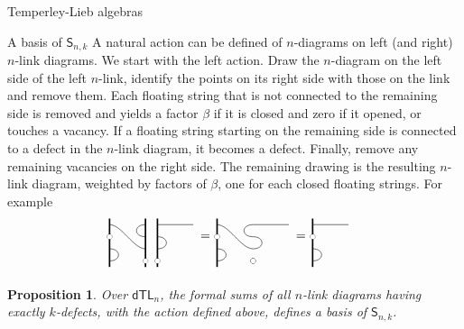 \documentclass[reqno]{amsart}
\newtheorem{Prop}[Thm]{Proposition}
\newcommand{\vac}[1]{\draw (#1) circle (1/5);
 	\fill[white] (#1) circle (1/5)}
\newcommand{\defect}[1]{\draw (#1) --++ (3,0)}
\newcommand{\bord}[2]{\draw[very thick] (#1,-1/2) --++ (0,#2)}
\newcommand{\link}[4]{\draw (#1) .. controls (#2) and (#3) .. (#4)}
\newcommand{\dtl}[1]{\mathsf{dTL}_{#1}}
\newcommand{\ds}[1]{\mathsf S_{#1}}
\begin{document}
\begin{section}{Temperley-Lieb algebras}
\begin{subsection}{A basis of $\ds{n,k}$}
A natural action can be defined of $n$-diagrams on left (and right) $n$-link diagrams. We start with the left action. Draw the $n$-diagram on the left side of the left $n$-link, identify the points on its right side with those on the link and remove them. Each floating string that is not connected to the remaining side is removed and yields a factor $\beta$ if it is closed and zero if it opened, or touches a vacancy. If a floating string starting on the remaining side is connected to a defect in the $n$-link diagram, it becomes a defect. Finally, remove any remaining vacancies on the right side. The remaining drawing is the resulting $n$-link diagram, weighted by factors of $\beta$, one for each closed floating strings. For example
\begin{align*}
\begin{tikzpicture}[scale = 1/3]
	\bord{0}{4};
	\bord{3}{4};
	\link{0,3}{1,3}{2,1}{3,1};
	\link{0,0}{1,0}{1,1}{0,1};
	\link{3,2}{2,2}{2,3}{3,3};
	\vac{0,2};
	\vac{3,0};
	\bord{4}{4};
	\defect{4,3};
	\link{4,2}{5,2}{5,1}{4,1};
	\vac{4,0};
	\node at (8,2) {$=$ };
\end{tikzpicture}&
\begin{tikzpicture}[scale = 1/3]
	\bord{0}{4};
	\link{0,3}{1,3}{2,1}{3,1};
	\link{0,0}{1,0}{1,1}{0,1};
	\link{3,2}{2,2}{2,3}{3,3};
	\vac{0,2};
	\vac{3,0};
	\defect{3,3};
	\link{3,2}{4,2}{4,1}{3,1};
	\vac{3,0};
	\node at (7,2) {$=$ };
\end{tikzpicture}
\begin{tikzpicture}[scale = 1/3]
	\bord{0}{4};
	\defect{0,3};
	\link{0,0}{1,0}{1,1}{0,1};
	\vac{0,2};
\end{tikzpicture}
\end{align*}
\begin{Prop}
Over $\dtl{n}$, the formal sums of all $n$-link diagrams having exactly $k$-defects, with the action defined above, defines a basis of $\ds{n,k}$.


\end{Prop}
\end{subsection}
\end{section}
\end{document}
